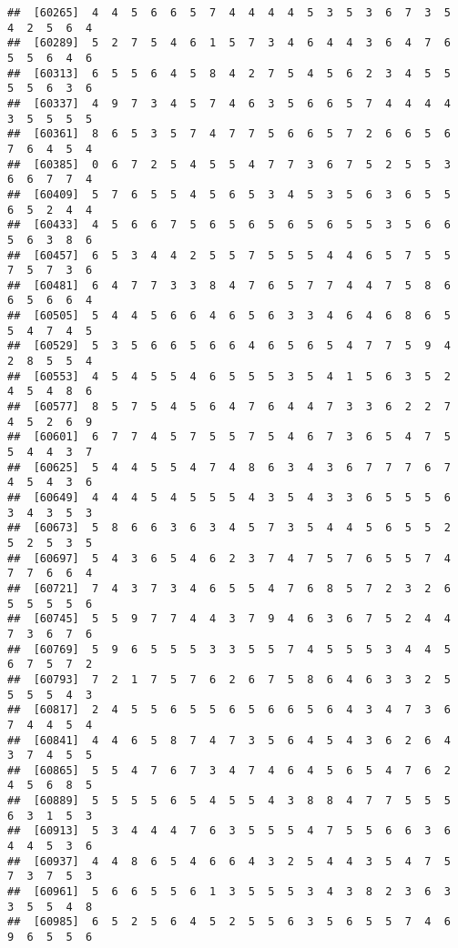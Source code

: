 \documentclass[
]{book}
\begin{document}
\begin{verbatim}
##  [60265]  4  4  5  6  6  5  7  4  4  4  4  5  3  5  3  6  7  3  5  4  2  5  6  4
##  [60289]  5  2  7  5  4  6  1  5  7  3  4  6  4  4  3  6  4  7  6  5  5  6  4  6
##  [60313]  6  5  5  6  4  5  8  4  2  7  5  4  5  6  2  3  4  5  5  5  5  6  3  6
##  [60337]  4  9  7  3  4  5  7  4  6  3  5  6  6  5  7  4  4  4  4  3  5  5  5  5
##  [60361]  8  6  5  3  5  7  4  7  7  5  6  6  5  7  2  6  6  5  6  7  6  4  5  4
##  [60385]  0  6  7  2  5  4  5  5  4  7  7  3  6  7  5  2  5  5  3  6  6  7  7  4
##  [60409]  5  7  6  5  5  4  5  6  5  3  4  5  3  5  6  3  6  5  5  6  5  2  4  4
##  [60433]  4  5  6  6  7  5  6  5  6  5  6  5  6  5  5  3  5  6  6  5  6  3  8  6
##  [60457]  6  5  3  4  4  2  5  5  7  5  5  5  4  4  6  5  7  5  5  7  5  7  3  6
##  [60481]  6  4  7  7  3  3  8  4  7  6  5  7  7  4  4  7  5  8  6  6  5  6  6  4
##  [60505]  5  4  4  5  6  6  4  6  5  6  3  3  4  6  4  6  8  6  5  5  4  7  4  5
##  [60529]  5  3  5  6  6  5  6  6  4  6  5  6  5  4  7  7  5  9  4  2  8  5  5  4
##  [60553]  4  5  4  5  5  4  6  5  5  5  3  5  4  1  5  6  3  5  2  4  5  4  8  6
##  [60577]  8  5  7  5  4  5  6  4  7  6  4  4  7  3  3  6  2  2  7  4  5  2  6  9
##  [60601]  6  7  7  4  5  7  5  5  7  5  4  6  7  3  6  5  4  7  5  5  4  4  3  7
##  [60625]  5  4  4  5  5  4  7  4  8  6  3  4  3  6  7  7  7  6  7  4  5  4  3  6
##  [60649]  4  4  4  5  4  5  5  5  4  3  5  4  3  3  6  5  5  5  6  3  4  3  5  3
##  [60673]  5  8  6  6  3  6  3  4  5  7  3  5  4  4  5  6  5  5  2  5  2  5  3  5
##  [60697]  5  4  3  6  5  4  6  2  3  7  4  7  5  7  6  5  5  7  4  7  7  6  6  4
##  [60721]  7  4  3  7  3  4  6  5  5  4  7  6  8  5  7  2  3  2  6  5  5  5  5  6
##  [60745]  5  5  9  7  7  4  4  3  7  9  4  6  3  6  7  5  2  4  4  7  3  6  7  6
##  [60769]  5  9  6  5  5  5  3  3  5  5  7  4  5  5  5  3  4  4  5  6  7  5  7  2
##  [60793]  7  2  1  7  5  7  6  2  6  7  5  8  6  4  6  3  3  2  5  5  5  5  4  3
##  [60817]  2  4  5  5  6  5  5  6  5  6  6  5  6  4  3  4  7  3  6  7  4  4  5  4
##  [60841]  4  4  6  5  8  7  4  7  3  5  6  4  5  4  3  6  2  6  4  3  7  4  5  5
##  [60865]  5  5  4  7  6  7  3  4  7  4  6  4  5  6  5  4  7  6  2  4  5  6  8  5
##  [60889]  5  5  5  5  6  5  4  5  5  4  3  8  8  4  7  7  5  5  5  6  3  1  5  3
##  [60913]  5  3  4  4  4  7  6  3  5  5  5  4  7  5  5  6  6  3  6  4  4  5  3  6
##  [60937]  4  4  8  6  5  4  6  6  4  3  2  5  4  4  3  5  4  7  5  7  3  7  5  3
##  [60961]  5  6  6  5  5  6  1  3  5  5  5  3  4  3  8  2  3  6  3  3  5  5  4  8
##  [60985]  6  5  2  5  6  4  5  2  5  5  6  3  5  6  5  5  7  4  6  9  6  5  5  6

\end{verbatim}
\end{document}
